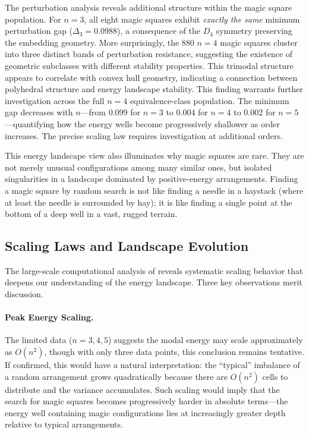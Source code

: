 The perturbation analysis reveals additional structure within the magic square population.
For $n=3$, all eight magic squares exhibit \emph{exactly the same} minimum perturbation gap 
($\Delta_3 = 0.0988$), a consequence of the $D_4$ symmetry preserving the embedding geometry.
More surprisingly, the 880 $n=4$ magic squares cluster into three distinct bands 
of perturbation resistance, suggesting the existence of geometric subclasses 
with different stability properties.
This trimodal structure appears to correlate with convex hull geometry,
indicating a connection between polyhedral structure and energy landscape stability.
This finding warrants further investigation across the full $n=4$ equivalence-class population.
The minimum gap decreases with $n$---from 0.099 for $n=3$ to 0.004 for $n=4$ to 0.002 for $n=5$---quantifying 
how the energy wells become progressively shallower as order increases.
The precise scaling law requires investigation at additional orders.

This energy landscape view also illuminates why magic squares are rare.
They are not merely unusual configurations among many similar ones, but isolated singularities 
in a landscape dominated by positive-energy arrangements.
Finding a magic square by random search is not like finding a needle in a haystack 
(where at least the needle is surrounded by hay);
it is like finding a single point at the bottom of a deep well in a vast, rugged terrain.

\subsection{Scaling Laws and Landscape Evolution}

The large-scale computational analysis of  reveals 
systematic scaling behavior that deepens our understanding of the energy landscape.
Three key observations merit discussion.

\paragraph{Peak Energy Scaling.}
The limited data ($n=3,4,5$) suggests the modal energy may scale approximately as $O(n^2)$,
though with only three data points, this conclusion remains tentative.
If confirmed, this would have a natural interpretation:
the ``typical'' imbalance of a random arrangement grows quadratically 
because there are $O(n^2)$ cells to distribute and the variance accumulates.
Such scaling would imply that the search for magic squares becomes progressively harder 
in absolute terms---the energy well containing magic configurations lies at increasingly 
greater depth relative to typical arrangements.

